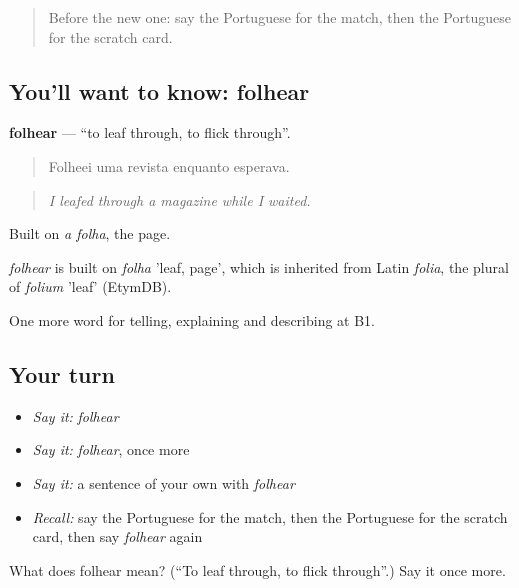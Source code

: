 \label{lesson:PT-C448-folhear}



\begin{quote}
Before the new one: say the Portuguese for the match, then the Portuguese for the scratch card.
\end{quote}

\subsection*{You'll want to know: folhear}
\textbf{folhear} — \textquotedblleft{}to leaf through, to flick through\textquotedblright{}.

\begin{quote}
Folheei uma revista enquanto esperava.
\end{quote}

\begin{quote}
\emph{I leafed through a magazine while I waited.}
\end{quote}

Built on \emph{a folha}, the page.

\begin{cousinweb}
\emph{folhear} is built on \emph{folha} 'leaf, page', which is inherited from Latin \emph{folia}, the plural of \emph{folium} 'leaf' (EtymDB).
\end{cousinweb}

\begin{grammarlens}[title={What you've built}]
One more word for telling, explaining and describing at B1.
\end{grammarlens}

\subsection*{Your turn}
\begin{itemize}
\raggedright
  \item \emph{Say it:} \emph{folhear}
  \item \emph{Say it:} \emph{folhear}, once more
  \item \emph{Say it:} a sentence of your own with \emph{folhear}
  \item \emph{Recall:} say the Portuguese for the match, then the Portuguese for the scratch card, then say \emph{folhear} again
\end{itemize}

\begin{tcolorbox}[breakable,colback=teal!4,colframe=teal!35!black,title={Before you move on}]
What does folhear mean? (\textquotedblleft{}To leaf through, to flick through\textquotedblright{}.) Say it once more.
\end{tcolorbox}
